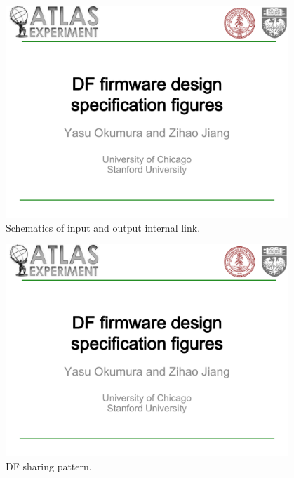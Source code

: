 \documentclass[11pt,letterpaper]{article}
\begin{document}
\begin{figure}[h!]
  \centering
  \includegraphics[width=0.95\textwidth,clip,page=14]{figures.pdf}
  \caption{Schematics of input and output internal link.}
  \label{fig:EVENT_INTERNALINK_INOUT}
\end{figure}


\begin{figure}[h!]
  \centering
  \includegraphics[width=0.95\textwidth,clip,page=15]{figures.pdf}
  \caption{DF sharing pattern.}
  \label{fig:DATA_SHARING_PATTERN}
\end{figure}


\clearpage

\appendix
\end{document}

